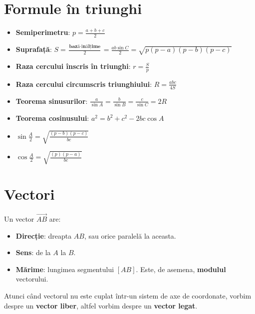 \documentclass{article}
\begin{document}
\section*{Formule în triunghi}
\begin{itemize}
    \item \textbf{Semiperimetru}: $p = \frac{a+b+c}{2}$
    \item \textbf{Suprafață}: $S = \frac{\textbf{bază}\cdot\textbf{înălțime}}{2} = \frac{a b \sin C}{2} = \sqrt{p(p-a)(p-b)(p-c)}$
    \item \textbf{Raza cercului înscris în triunghi}: $r = \frac{S}{p}$
    \item \textbf{Raza cercului circumscris triunghiului}: $R = \frac{abc}{4S}$
    \item \textbf{Teorema sinusurilor}: $\frac{a}{\sin A} = \frac{b}{\sin B} = \frac{c}{\sin C} = 2R$
    \item \textbf{Teorema cosinusului}: $a^2 = b^2 + c^2 - 2bc\cos A$
    \item $\sin \frac{A}{2} = \sqrt{\frac{(p-b)(p-c)}{bc}}$
    \item $\cos \frac{A}{2} = \sqrt{\frac{(p)(p-a)}{bc}}$
\end{itemize}
\section*{Vectori}
Un vector $\overrightarrow{AB}$ are:
\begin{itemize}
    \item \textbf{Direcție}: dreapta $AB$, sau orice paralelă la aceasta.
    \item \textbf{Sens}: de la $A$ la $B$.
    \item \textbf{Mărime}: lungimea segmentului $[AB]$. Este, de asemena, \textbf{modulul} vectorului.
\end{itemize}

Atunci când vectorul nu este cuplat într-un sistem de axe de coordonate, vorbim despre un \textbf{vector liber}, altfel vorbim despre un \textbf{vector legat}.
\end{document}
